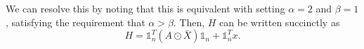 We can resolve this by noting that this is equivalent with setting $\alpha = 2$ and $\beta = 1$, satisfying the requirement that $\alpha > \beta$.
Then, $H$ can be written succinctly as
\begin{equation}
    H = \mathds{1}_n^T \left( A \odot \bar{X} \right) \mathds{1}_n + \mathds{1}_n^T x.
\end{equation}

